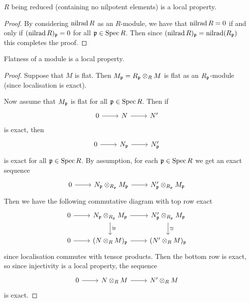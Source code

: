 \begin{cor}
  $R$ being reduced (containing no nilpotent elements) is a local property.
\end{cor}

\begin{proof}
  By considering $\operatorname{nilrad} R$ as an $R$-module, we have that $\operatorname{nilrad} R =0$ if and only if $(\operatorname{nilrad} R)_{\mathfrak{p}}=0$ for all $\mathfrak{p} \in \operatorname{Spec} R$.
  Then since $(\operatorname{nilrad} R)_{\mathfrak{p}} = \operatorname{nilrad}(R_{\mathfrak{p}})$ this completes the proof.
\end{proof}

\begin{prop}[2.21]
  Flatness of a module is a local property.
\end{prop}

\begin{proof}
  Suppose that $M$ is flat.
  Then $M_{\mathfrak{p}} = R_{\mathfrak{p}} \otimes_R M$ is flat as an $R_{\mathfrak{p}}$-module (since localisation is exact).

  Now assume that $M_{\mathfrak{p}}$ is flat for all $\mathfrak{p} \in \operatorname{Spec} R$.
  Then if
  \begin{equation*}
    \begin{tikzcd}
      0 \ar[r] & N \ar[r] & N'
    \end{tikzcd}
  \end{equation*}
  is exact, then
  \begin{equation*}
    \begin{tikzcd}
      0 \ar[r] & N_\kp \ar[r] & N_\kp'
    \end{tikzcd}
  \end{equation*}
  is exact for all $\mathfrak{p} \in \operatorname{Spec} R$.
  By assumption, for each $\mathfrak{p} \in \operatorname{Spec} R$ we get an exact sequence
  \begin{equation*}
    \begin{tikzcd}
      0 \ar[r] & N_\kp \otimes_{R_\kp} M_\kp \ar[r] & N_\kp' \otimes_{R_\kp} M_\kp
    \end{tikzcd}
  \end{equation*}
  Then we have the following commutative diagram with top row exact
  \begin{equation*}
    \begin{tikzcd}
      0 \ar[r] & N_\kp \otimes_{R_\kp} M_\kp \ar[r] \ar[d, "\cong"] & N_\kp' \otimes_{R_\kp} M_\kp \ar[d, "\cong"] \\
      0 \ar[r] & (N \otimes_R M)_\kp \ar[r] & (N' \otimes_R M)_\kp
    \end{tikzcd}
  \end{equation*}
  since localisation commutes with tensor products.
  Then the bottom row is exact, so since injectivity is a local property, the sequence
  \begin{equation*}
    \begin{tikzcd}
      0 \ar[r] & N \otimes_{R} M \ar[r] & N' \otimes_{R} M
    \end{tikzcd}
  \end{equation*}
  is exact.
\end{proof}

